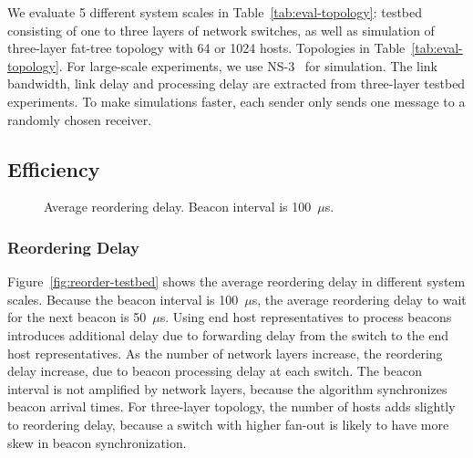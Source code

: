 We evaluate 5 different system scales in Table~\ref{tab:eval-topology}: testbed consisting of one to three layers of network switches, as well as simulation of three-layer fat-tree topology with 64 or 1024 hosts.
Topologies in Table~\ref{tab:eval-topology}.
For large-scale experiments, we use NS-3~\cite{henderson2008network} for simulation. The link bandwidth, link delay and processing delay are extracted from three-layer testbed experiments. To make simulations faster, each sender only sends one message to a randomly chosen receiver.

\subsection{Efficiency}


\begin{figure}[t]
\centering
	\hspace{0.01\textwidth}
	\caption{Average reordering delay. Beacon interval is 100~$\mu$s.}
    \vspace{-5pt}
\label{fig:reorder-delay}
\end{figure}

\subsubsection{Reordering Delay}
\label{sec:eval-delay}

Figure~\ref{fig:reorder-testbed} shows the average reordering delay in different system scales. Because the beacon interval is 100~$\mu$s, the average reordering delay to wait for the next beacon is 50~$\mu$s. Using end host representatives to process beacons introduces additional delay due to forwarding delay from the switch to the end host representatives. As the number of network layers increase, the reordering delay increase, due to beacon processing delay at each switch. The beacon interval is not amplified by network layers, because the algorithm synchronizes beacon arrival times. For three-layer topology, the number of hosts adds slightly to reordering delay, because a switch with higher fan-out is likely to have more skew in beacon synchronization.

